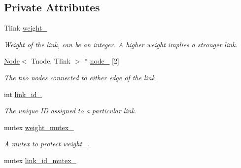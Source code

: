 \subsection*{Private Attributes}
\begin{DoxyCompactItemize}
\item 
Tlink \hyperlink{classLink_a4b070bc8755475c63a0cbeda4435a5a9}{weight\+\_\+}\hypertarget{classLink_a4b070bc8755475c63a0cbeda4435a5a9}{}\label{classLink_a4b070bc8755475c63a0cbeda4435a5a9}

\begin{DoxyCompactList}\small\item\em Weight of the link, can be an integer. A higher weight implies a stronger link. \end{DoxyCompactList}\item 
\hyperlink{classNode}{Node}$<$ Tnode, Tlink $>$ $\ast$ \hyperlink{classLink_aeb73083e229485a383509f87e0e0dca3}{node\+\_\+} \mbox{[}2\mbox{]}\hypertarget{classLink_aeb73083e229485a383509f87e0e0dca3}{}\label{classLink_aeb73083e229485a383509f87e0e0dca3}

\begin{DoxyCompactList}\small\item\em The two nodes connected to either edge of the link. \end{DoxyCompactList}\item 
int \hyperlink{classLink_a628aea1d6ecfd27c1250e0369524f4e8}{link\+\_\+id\+\_\+}\hypertarget{classLink_a628aea1d6ecfd27c1250e0369524f4e8}{}\label{classLink_a628aea1d6ecfd27c1250e0369524f4e8}

\begin{DoxyCompactList}\small\item\em The unique ID assigned to a particular link. \end{DoxyCompactList}\item 
mutex \hyperlink{classLink_a9df48228aef5f47aabd78bf2ed9204e1}{weight\+\_\+mutex\+\_\+}\hypertarget{classLink_a9df48228aef5f47aabd78bf2ed9204e1}{}\label{classLink_a9df48228aef5f47aabd78bf2ed9204e1}

\begin{DoxyCompactList}\small\item\em A mutex to protect weight\+\_\+. \end{DoxyCompactList}\item 
mutex \hyperlink{classLink_a6347b18f7b457771e36ce2b2a269d87b}{link\+\_\+id\+\_\+mutex\+\_\+}\hypertarget{classLink_a6347b18f7b457771e36ce2b2a269d87b}{}\label{classLink_a6347b18f7b457771e36ce2b2a269d87b}


\end{DoxyCompactItemize}
